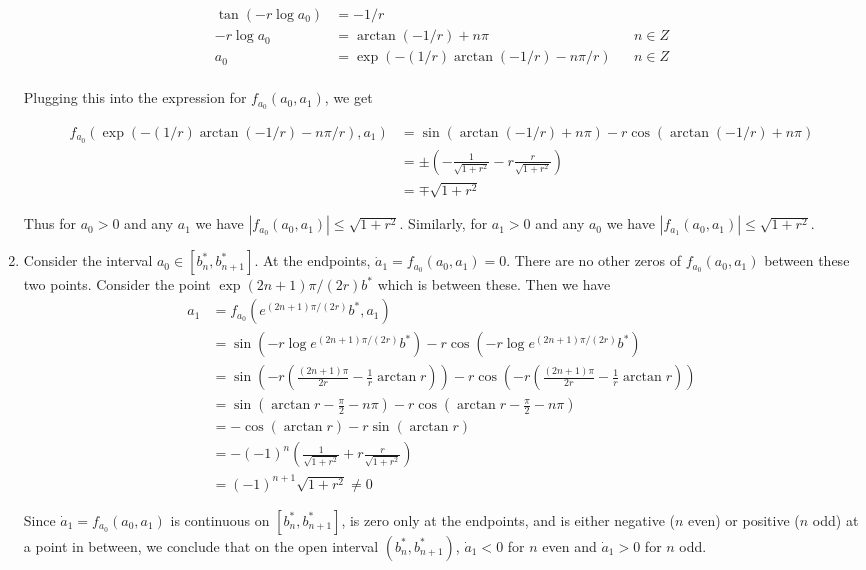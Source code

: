 \documentclass[12pt]{article}
\begin{document}
\begin{enumerate}
\begin{align*}
\tan(-r \log a_0) &= -1/r \\
-r \log a_0 &= \arctan(-1/r) + n \pi && n \in Z \\
a_0 &= \exp\left( -(1/r) \arctan(-1/r) - n \pi/r \right) && n \in Z \\
\end{align*}

Plugging this into the expression for $f_{a_0}(a_0, a_1)$, we get

\begin{align*}
f_{a_0}(\exp(-(1/r) \arctan(-1/r) - n \pi/r), a_1) &=
\sin(\arctan(-1/r) + n \pi) - r \cos(\arctan(-1/r) + n \pi) \\
&= \pm \left( -\frac{1}{\sqrt{1 + r^2}} - r \frac{r}{\sqrt{1 + r^2}} \right) \\
&= \mp \sqrt{1 + r^2}
\end{align*}

Thus for $a_0 > 0$ and any $a_1$ we have $|f_{a_0}(a_0, a_1)| \leq \sqrt{1 + r^2}$. Similarly, for $a_1 > 0$ and any $a_0$ we have $|f_{a_1}(a_0, a_1)| \leq \sqrt{1 + r^2}$. 

\item Consider the interval $a_0 \in [b^*_n, b^*_{n+1}]$. At the endpoints, $\dot a_1 = f_{a_0}(a_0, a_1) = 0$. There are no other zeros of $f_{a_0}(a_0, a_1)$ between these two points. Consider the point $\exp{(2n+1)\pi/(2r) }b^*$ which is between these. Then we have
\begin{align*}
a_1 &= f_{a_0}(e^{(2n+1) \pi / (2r)}b^*, a_1) \\
&= \sin(-r \log e^{(2n+1) \pi / (2r)} b^* ) - r \cos( -r \log e^{(2n+1) \pi / (2r)} b^* ) \\
&= \sin\left(-r \left( \frac{(2n + 1)\pi}{2r} - \frac{1}{r} \arctan r \right) \right) - r \cos\left(-r \left( \frac{(2n + 1)\pi}{2r} - \frac{1}{r} \arctan r \right) \right) \\
&= \sin\left(\arctan r - \frac{\pi}{2} - n \pi \right) - r \cos\left(\arctan r - \frac{\pi}{2} - n \pi \right) \\
&= -\cos\left(\arctan r \right) - r \sin\left(\arctan r\right) \\
&= -(-1)^n \left( \frac{1}{\sqrt{1+r^2}} + r \frac{r}{\sqrt{1+r^2}}  \right) \\
&= (-1)^{n+1}\sqrt{1 + r^2} \neq 0
\end{align*}

Since $\dot a_1 = f_{a_0}(a_0, a_1)$ is continuous on $[b^*_n, b^*_{n+1}]$, is zero only at the endpoints, and is either negative ($n$ even) or positive ($n$ odd) at a point in between, we conclude that on the open interval $(b^*_n, b^*_{n+1})$, $\dot a_1 < 0$ for $n$ even and $\dot a_1 > 0$ for $n$ odd.\\


\end{enumerate}
\end{document}
